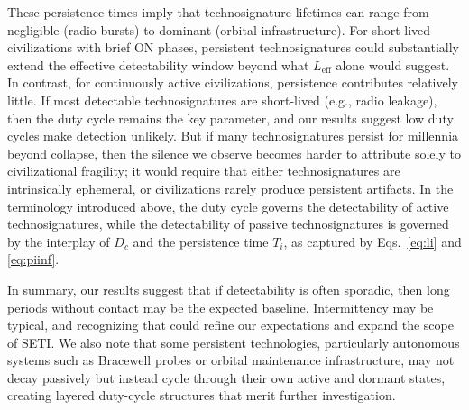 These persistence times imply that technosignature lifetimes can range from negligible (radio bursts) to dominant (orbital infrastructure). For short-lived civilizations with brief ON phases, persistent technosignatures could substantially extend the effective detectability window beyond what $L_{\mathrm{eff}}$ alone would suggest. In contrast, for continuously active civilizations, persistence contributes relatively little. If most detectable technosignatures are short-lived (e.g., radio leakage), then the duty cycle remains the key parameter, and our results suggest low duty cycles make detection unlikely. But if many technosignatures persist for millennia beyond collapse, then the silence we observe becomes harder to attribute solely to civilizational fragility; it would require that either technosignatures are intrinsically ephemeral, or civilizations rarely produce persistent artifacts. In the terminology introduced above, the duty cycle governs the detectability of active technosignatures, while the detectability of passive technosignatures is governed by the interplay of $D_c$ and the persistence time $T_i$, as captured by Eqs.~\eqref{eq:li} and \eqref{eq:piinf}.

In summary, our results suggest that if detectability is often sporadic, then long periods without contact may be the expected baseline. Intermittency may be typical, and recognizing that could refine our expectations and expand the scope of SETI. We also note that some persistent technologies, particularly autonomous systems such as Bracewell probes \citep{Bracewell1960-bp} or orbital maintenance infrastructure, may not decay passively but instead cycle through their own active and dormant states, creating layered duty-cycle structures that merit further investigation.

